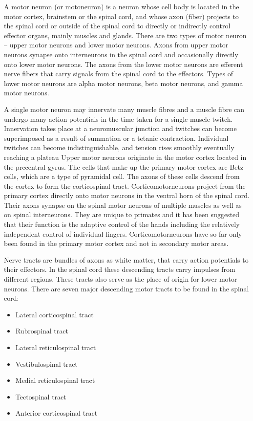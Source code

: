 \documentclass[]{book}
\providecommand{\tightlist}{%
  \setlength{\itemsep}{0pt}\setlength{\parskip}{0pt}}
\begin{document}
A motor neuron (or motoneuron) is a neuron whose cell body is located in the motor cortex, brainstem or the spinal cord, and whose axon (fiber) projects to the spinal cord or outside of the spinal cord to directly or indirectly control effector organs, mainly muscles and glands. There are two types of motor neuron -- upper motor neurons and lower motor neurons. Axons from upper motor neurons synapse onto interneurons in the spinal cord and occasionally directly onto lower motor neurons. The axons from the lower motor neurons are efferent nerve fibers that carry signals from the spinal cord to the effectors. Types of lower motor neurons are alpha motor neurons, beta motor neurons, and gamma motor neurons.

A single motor neuron may innervate many muscle fibres and a muscle fibre can undergo many action potentials in the time taken for a single muscle twitch. Innervation takes place at a neuromuscular junction and twitches can become superimposed as a result of summation or a tetanic contraction. Individual twitches can become indistinguishable, and tension rises smoothly eventually reaching a plateau
Upper motor neurons originate in the motor cortex located in the precentral gyrus. The cells that make up the primary motor cortex are Betz cells, which are a type of pyramidal cell. The axons of these cells descend from the cortex to form the corticospinal tract. Corticomotorneurons project from the primary cortex directly onto motor neurons in the ventral horn of the spinal cord. Their axons synapse on the spinal motor neurons of multiple muscles as well as on spinal interneurons. They are unique to primates and it has been suggested that their function is the adaptive control of the hands including the relatively independent control of individual fingers. Corticomotorneurons have so far only been found in the primary motor cortex and not in secondary motor areas.

Nerve tracts are bundles of axons as white matter, that carry action potentials to their effectors. In the spinal cord these descending tracts carry impulses from different regions. These tracts also serve as the place of origin for lower motor neurons. There are seven major descending motor tracts to be found in the spinal cord:

\begin{itemize}
\tightlist
\item
  Lateral corticospinal tract
\item
  Rubrospinal tract
\item
  Lateral reticulospinal tract
\item
  Vestibulospinal tract
\item
  Medial reticulospinal tract
\item
  Tectospinal tract
\item
  Anterior corticospinal tract
\end{itemize}
\end{document}
